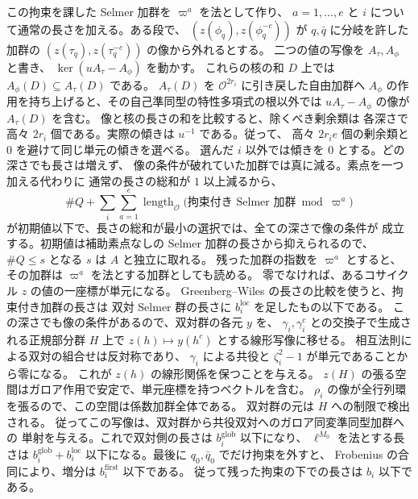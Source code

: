 この拘束を課した Selmer 加群を \(\varpi^a\) を法として作り、
\(a=1,\ldots,e\) と \(i\) について通常の長さを加える。ある段で、
\((z(\phi_q),z(\phi_q^{-c}))\) が \(q,\bar q\) に分岐を許した加群の
\((z(\tau_q),z(\tau_q^{-c}))\) の像から外れるとする。
二つの値の写像を \(A_\tau,A_\phi\) と書き、
\(\ker(u A_\tau-A_\phi)\) を動かす。
これらの核の和 \(D\) 上では \(A_\phi(D)\subseteq A_\tau(D)\) である。
\(A_\tau(D)\) を \(\mathcal O^{2r_i}\) に引き戻した自由加群へ
\(A_\phi\) の作用を持ち上げると、その自己準同型の特性多項式の根以外では
\(u A_\tau-A_\phi\) の像が \(A_\tau(D)\) を含む。
像と核の長さの和を比較すると、除くべき剰余類は
各深さで高々 \(2r_i\) 個である。実際の傾きは \(u^{-1}\) である。従って、
高々 \(2r_i e\) 個の剰余類と \(0\) を避けて同じ単元の傾きを選べる。
選んだ \(i\) 以外では傾きを \(0\) とする。どの深さでも長さは増えず、
像の条件が破れていた加群では真に減る。素点を一つ加える代わりに
通常の長さの総和が \(1\) 以上減るから、
\[
 \#Q+\sum_{i}\sum_{a=1}^e
     \operatorname{length}_{\mathcal O}
        \bigl(\text{拘束付き Selmer 加群}\bmod\varpi^a\bigr)
\]
が初期値以下で、長さの総和が最小の選択では、全ての深さで像の条件が
成立する。初期値は補助素点なしの Selmer 加群の長さから抑えられるので、
\(\#Q\le s\) となる \(s\) は \(A\) と独立に取れる。
残った加群の指数を \(\varpi^a\) とすると、その加群は
\(\varpi^a\) を法とする加群としても読める。
零でなければ、あるコサイクル \(z\) の値の一座標が単元になる。
Greenberg--Wiles の長さの比較を使うと、拘束付き加群の長さは
双対 Selmer 群の長さに \(b_i^{\mathrm{loc}}\) を足したもの以下である。
この深さでも像の条件があるので、双対群の各元 \(y\) を、
\(\gamma_i,\gamma_i^c\) との交換子で生成される正規部分群 \(H\) 上で
\(z(h)\mapsto y(h^c)\) とする線形写像に移せる。
相互法則による双対の組合せは反対称であり、
\(\gamma_i\) による共役と \(\zeta_i^2-1\) が単元であることから零になる。
これが \(z(h)\) の線形関係を保つことを与える。
\(z(H)\) の張る空間はガロア作用で安定で、単元座標を持つベクトルを含む。
\(\rho_i\) の像が全行列環を張るので、この空間は係数加群全体である。
双対群の元は \(H\) への制限で検出される。
従ってこの写像は、双対群から共役双対へのガロア同変準同型加群への
単射を与える。これで双対側の長さは \(b_i^{\mathrm{glob}}\) 以下になり、
\(\ell^{M_0}\) を法とする長さは \(b_i^{\mathrm{glob}}+b_i^{\mathrm{loc}}\)
以下になる。最後に \(q_0,\bar q_0\) でだけ拘束を外すと、
Frobenius の合同により、増分は \(b_i^{\mathrm{first}}\) 以下である。
従って残った拘束の下での長さは \(b_i\) 以下である。

